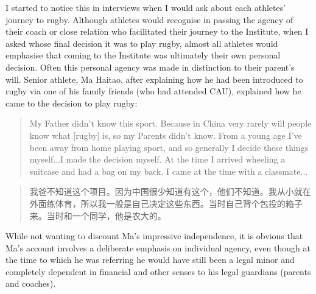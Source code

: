 \begin{CJK}{UTF8}{gbsn}
I started to notice this in interviews when I would ask about each athletes' journey to rugby.  Although athletes would recognise in passing the agency of their coach or close relation who facilitated their journey to the Institute, when I asked whose final decision it was to play rugby, almost all athletes would emphasise that coming to the Institute was ultimately their own personal decision.  Often this personal agency was made in distinction to their parent's will.  Senior athlete, Ma Haitao, after explaining how he had been introduced to rugby via one of his family friends (who had attended CAU), explained how he came to the decision to play rugby:
       \begin{quote}
         My Father didn't know this sport.  Because in China very rarely will people know what [rugby] is, so my Parents didn't know. From a young age I've been away from home playing sport, and so generally I decide these things myself...I made the decision myself.  At the time I arrived wheeling a suitcase and had a bag on my back.  I came at the time with a classmate...
       \end{quote}
       \begin{quote}
         我爸不知道这个项目。因为中国很少知道有这个，他们不知道。我从小就在外面练体育，所以我一般是自己决定这些东西。当时自己背个包投的箱子来。当时和一个同学，他是农大的。
       \end{quote}

While not wanting to discount Ma's impressive independence, it is obvious that Ma’s account involves a deliberate emphasis on individual agency, even though at the time to which he was referring he would have still been a legal minor and completely dependent in financial and other senses to his legal guardians (parents and coaches).


\end{CJK}
